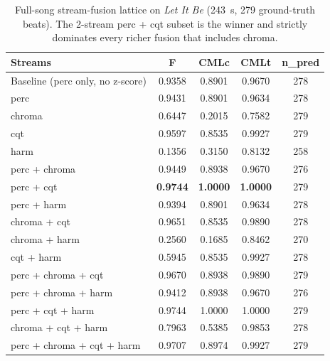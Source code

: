\documentclass{article}
\begin{document}
\begin{table}[ht]
    \centering
    \caption{Full-song stream-fusion lattice on \textit{Let It Be} (243~s, 279 ground-truth beats). The 2-stream perc + cqt subset is the winner and strictly dominates every richer fusion that includes chroma.}
    \label{tab:streams}
    \begin{tabular}{lcccc}
        \toprule
        Streams                          & F               & CMLc            & CMLt            & n\_pred \\
        \midrule
        Baseline (perc only, no z-score) & 0.9358          & 0.8901          & 0.9670          & 278     \\
        \midrule
        perc                             & 0.9431          & 0.8901          & 0.9634          & 278     \\
        chroma                           & 0.6447          & 0.2015          & 0.7582          & 279     \\
        cqt                              & 0.9597          & 0.8535          & 0.9927          & 279     \\
        harm                             & 0.1356          & 0.3150          & 0.8132          & 258     \\
        \midrule
        perc + chroma                    & 0.9449          & 0.8938          & 0.9670          & 276     \\
        perc + cqt                       & \textbf{0.9744} & \textbf{1.0000} & \textbf{1.0000} & 279     \\
        perc + harm                      & 0.9394          & 0.8901          & 0.9634          & 278     \\
        chroma + cqt                     & 0.9651          & 0.8535          & 0.9890          & 278     \\
        chroma + harm                    & 0.2560          & 0.1685          & 0.8462          & 270     \\
        cqt + harm                       & 0.5945          & 0.8535          & 0.9927          & 278     \\
        \midrule
        perc + chroma + cqt              & 0.9670          & 0.8938          & 0.9890          & 279     \\
        perc + chroma + harm             & 0.9412          & 0.8938          & 0.9670          & 276     \\
        perc + cqt + harm                & 0.9744          & 1.0000          & 1.0000          & 279     \\
        chroma + cqt + harm              & 0.7963          & 0.5385          & 0.9853          & 278     \\
        \midrule
        perc + chroma + cqt + harm       & 0.9707          & 0.8974          & 0.9927          & 279     \\
        \bottomrule
    \end{tabular}
\end{table}
\end{document}
